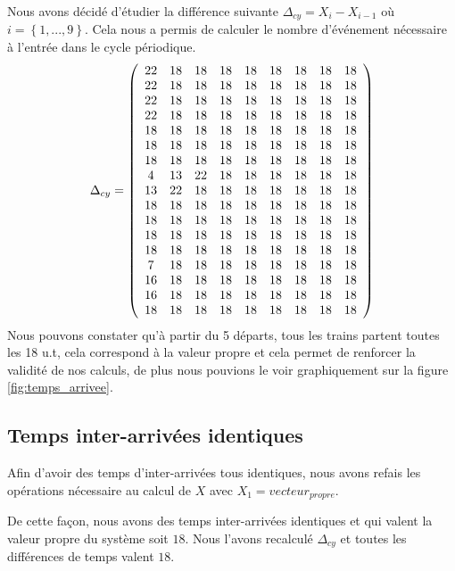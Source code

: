 Nous avons décidé d'étudier la différence suivante $\Delta_{cy} = X_i - X_{i-1}$ où $i = \left\lbrace 1,...,9\right\rbrace$. Cela nous a permis de calculer le nombre d'événement nécessaire à l'entrée dans le cycle périodique.
\begin{equation}
\Delta_{cy} = 
\left(
\begin{array}{cc cc cc cc cc}
22 & 18 & 18 & 18 & 18 & 18 & 18 & 18 & 18 \\
22 & 18 & 18 & 18 & 18 & 18 & 18 & 18 & 18 \\
22 & 18 & 18 & 18 & 18 & 18 & 18 & 18 & 18 \\
22 & 18 & 18 & 18 & 18 & 18 & 18 & 18 & 18 \\
18 & 18 & 18 & 18 & 18 & 18 & 18 & 18 & 18 \\
18 & 18 & 18 & 18 & 18 & 18 & 18 & 18 & 18 \\
18 & 18 & 18 & 18 & 18 & 18 & 18 & 18 & 18 \\
4 &  13 & 22 & 18 & 18 & 18 & 18 & 18 & 18 \\
13 & 22 & 18 & 18 & 18 & 18 & 18 & 18 & 18 \\
18 & 18 & 18 & 18 & 18 & 18 & 18 & 18 & 18 \\
18 & 18 & 18 & 18 & 18 & 18 & 18 & 18 & 18 \\
18 & 18 & 18 & 18 & 18 & 18 & 18 & 18 & 18 \\
18 & 18 & 18 & 18 & 18 & 18 & 18 & 18 & 18 \\
7 &  18 & 18 & 18 & 18 & 18 & 18 & 18 & 18 \\
16 & 18 & 18 & 18 & 18 & 18 & 18 & 18 & 18 \\
16 & 18 & 18 & 18 & 18 & 18 & 18 & 18 & 18 \\
18 & 18 & 18 & 18 & 18 & 18 & 18 & 18 & 18 
\end{array}
\right)
\end{equation}
Nous pouvons constater qu'à partir du  5\ieme{} départs, tous les trains partent toutes les 18 u.t, cela correspond à la valeur propre et cela permet de renforcer la validité de nos calculs, de plus nous pouvions le voir graphiquement sur la figure \ref{fig:temps_arrivee}.

\subsection{Temps inter-arrivées identiques}
Afin d'avoir des temps d'inter-arrivées tous identiques, nous avons refais les opérations nécessaire au calcul de $X$ avec $X_1=vecteur_{propre}$.

De cette façon, nous avons des temps inter-arrivées identiques et qui valent la valeur propre du système soit $18$. Nous l'avons recalculé $\Delta_{cy}$ et toutes les différences de temps valent $18$.



